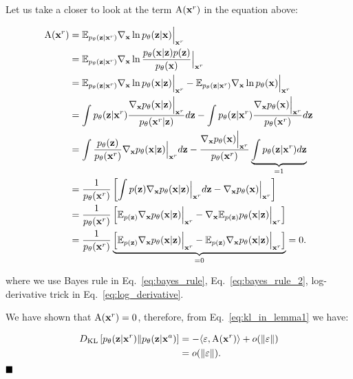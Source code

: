 Let us take a closer to look at the term $\text{A}({\mathbf{x}}^r)$ in the equation above:

\begin{align}
\text{A}(\rvx^r) &=    \E_{p_{\theta}(\rvz|\rvx^r)}  \nabla_{\rvx} \ln p_{\theta}(\rvz|\rvx) \Big|_{\rvx^r} \\
&=  \E_{p_{\theta}(\rvz|\rvx^r)}  \nabla_{\rvx} \ln \frac{p_{\theta}(\rvx|\rvz)p(\rvz)}{p_{\theta}(\rvx)} \Big|_{\rvx^r}   \label{eq:bayes_rule}  \\
&= \E_{p_{\theta}(\rvz|\rvx^r)}  \nabla_{\rvx} \ln p_{\theta}(\rvx|\rvz) \Big|_{\rvx^r} - \E_{p_{\theta}(\rvz|\rvx^r)}  \nabla_{\rvx} \ln p_{\theta}(\rvx) \Big|_{\rvx^r} \\
&= \int p_{\theta}(\rvz|\rvx^r)\frac{\nabla_{\rvx} p_{\theta}(\rvx|\rvz)\Big|_{\rvx^r}}{p_{\theta}(\rvx^r|\rvz)}d\rvz - \int p_{\theta}(\rvz|\rvx^r)\frac{\nabla_{\rvx} p_{\theta}(\rvx)\Big|_{\rvx^r}}{p_{\theta}(\rvx^r)} d\rvz  
\label{eq:log_derivative}\\
&= \int \frac{p_{\theta}(\rvz)}{p_{\theta}(\rvx^r)} \nabla_{\rvx} p_{\theta}(\rvx|\rvz)\Big|_{\rvx^r} d\rvz - \frac{\nabla_{\rvx} p_{\theta}(\rvx)\Big|_{\rvx^r}}{p_{\theta}(\rvx^r)}  \underbrace{\int p_{\theta}(\rvz|\rvx^r)d\rvz }_{=1}  \label{eq:bayes_rule_2} \\
&= \frac{1}{p_{\theta}(\rvx^r)} \left[ \int p(\rvz) \nabla_{\rvx} p_{\theta}(\rvx|\rvz)\Big|_{\rvx^r} d\rvz - \nabla_{\rvx} p_{\theta}(\rvx)\Big|_{\rvx^r} \right]\\
&= \frac{1}{p_{\theta}(\rvx^r)} \left[ \E_{p(\rvz)} \nabla_{\rvx} p_{\theta}(\rvx|\rvz)\Big|_{\rvx^r} - \nabla_{\rvx} \E_{p(\rvz)}p_{\theta}(\rvx|\rvz)\Big|_{\rvx^r} \right]\\
&= \frac{1}{p_{\theta}(\rvx^r)}  \underbrace{\left[ \E_{p(\rvz)} \nabla_{\rvx} p_{\theta}(\rvx|\rvz)\Big|_{\rvx^r} -  \E_{p(\rvz)}\nabla_{\rvx} p_{\theta}(\rvx|\rvz)\Big|_{\rvx^r} \right]}_{=0} = 0.
\end{align}

where we use Bayes rule in Eq.~\ref{eq:bayes_rule}, Eq.~\ref{eq:bayes_rule_2}, log-derivative trick in Eq.~\ref{eq:log_derivative}. 

We have shown that $\text{A}({\mathbf{x}}^r) = 0$, therefore, from Eq.~\ref{eq:kl_in_lemma1} we have:
 
\begin{align}
    D_{\mathrm{KL}}\left[p_{\theta}({\mathbf{z}}|{\mathbf{x}}^r)\|p_{\theta}({\mathbf{z}}|{\mathbf{x}}^a)\right] &= -\langle \varepsilon, \text{A}({\mathbf{x}}^r) \rangle + o(\|\varepsilon\|) \\
    &= o(\|\varepsilon\|). 
\end{align}
$\hfill\blacksquare$

